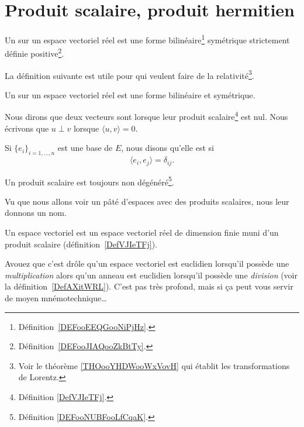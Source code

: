 \section{Produit scalaire, produit hermitien}

\begin{definition}\label{DefVJIeTFj}
	Un  sur un espace vectoriel réel est une forme bilinéaire\footnote{Définition~\ref{DEFooEEQGooNiPjHz}.} symétrique strictement définie positive\footnote{Définition~\ref{DEFooJIAQooZkBtTy}.}.
\end{definition}

La définition suivante est utile pour  qui veulent faire de la relativité\footnote{Voir le théorème \ref{THOooYHDWooWxVovH} qui établit les transformations de Lorentz.}.
\begin{definition}      \label{DEFooLPBGooXLxubc}
	Un  sur un espace vectoriel réel est une forme bilinéaire et symétrique.
\end{definition}

\begin{definition}      \label{DEFooZBWTooIqXwRp}
	Nous dirons que deux vecteurs sont  lorsque leur produit scalaire\footnote{Définition \ref{DefVJIeTFj}.} est nul. Nous écrivons que \( u\perp v\) lorsque \( \langle u, v\rangle =0\).

	Si \( \{ e_i \}_{i=1,\ldots, n}\) est une base de \( E\), nous disons qu'elle est  si
	\begin{equation}
		\langle e_i, e_j\rangle =\delta_{ij}.
	\end{equation}
\end{definition}

\begin{lemma}       \label{LEMooLPUFooVCvnwW}
	Un produit scalaire est toujours non dégénéré\footnote{Définition \ref{DEFooNUBFooLfCqaK}.}.
\end{lemma}


Vu que nous allons voir un pâté d'espaces avec des produits scalaires, nous leur donnons un nom.
\begin{definition}\label{DefLZMcvfj}
	Un espace vectoriel  est un espace vectoriel réel de dimension finie muni d'un produit scalaire (définition~\ref{DefVJIeTFj}).
\end{definition}
Avouez que c'est drôle qu'un espace vectoriel est euclidien lorsqu'il possède une \emph{multiplication} alors qu'un anneau est euclidien lorsqu'il possède une \emph{division} (voir la définition~\ref{DefAXitWRL}). C'est pas très profond, mais si ça peut vous servir de moyen mnémotechnique\ldots


